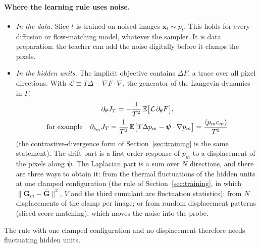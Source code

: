 \documentclass[11pt,a4paper]{article}
\newcommand{\vx}{\bm{x}}
\newcommand{\E}{\mathbb{E}}
\newcommand{\grad}{\nabla}
\begin{document}
\paragraph{Where the learning rule uses noise.}
\begin{itemize}
\item \emph{In the data.} Slice $t$ is trained on noised images $\vx_t\sim p_t$. This holds for every diffusion or
  flow-matching model, whatever the sampler. It is data preparation: the teacher can add the noise digitally before
  it clamps the pixels.
\item \emph{In the hidden units.} The implicit objective contains $\Delta F$, a trace over all pixel directions. With
  $\mathcal L\equiv T\Delta-\grad F\cdot\grad$, the generator of the Langevin dynamics in $F$,
  \begin{gather}
    \partial_\theta J_T=-\frac1{T^2}\,\E\big[\mathcal L\,\partial_\theta F\big],\label{eq:generator}\\
    \text{for example}\quad
    \partial_{b_m}J_T=\frac1{T^2}\,\E\big[T\Delta p_m-\bm\psi\cdot\grad p_m\big]=\frac{\langle p_mc_m\rangle}{T^3}\notag
  \end{gather}
  (the contrastive-divergence form of Section~\ref{sec:training} is the same statement). The drift part is a
  first-order response of $p_m$ to a displacement of the pixels along $\bm\psi$. The Laplacian part is a sum over
  $N$ directions, and there are three ways to obtain it: from the thermal fluctuations of the hidden units at one
  clamped configuration (the rule of Section~\ref{sec:training}, in which $\|\bm G_m-\bar{\bm G}\|^2$, $V$ and the
  third cumulant are fluctuation statistics); from $N$ displacements of the clamp per image; or from random
  displacement patterns (sliced score matching), which moves the noise into the probe.
\end{itemize}
The rule with one clamped configuration and no displacement therefore needs fluctuating hidden units.
\end{document}

